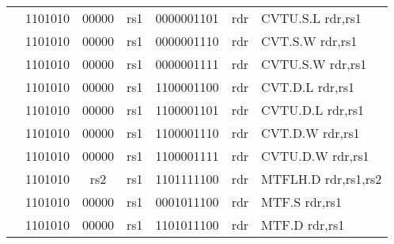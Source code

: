 \begin{table}[p]
\begin{small}
\begin{center}
\begin{tabular}{rcccccccccl}
&
\multicolumn{2}{|c|}{1101010} &
\multicolumn{1}{c|}{00000} &
\multicolumn{1}{c|}{rs1} &
\multicolumn{4}{c|}{0000001101} &
\multicolumn{1}{c|}{rdr} & CVTU.S.L rdr,rs1 \\
\cline{2-10}
  

&
\multicolumn{2}{|c|}{1101010} &
\multicolumn{1}{c|}{00000} &
\multicolumn{1}{c|}{rs1} &
\multicolumn{4}{c|}{0000001110} &
\multicolumn{1}{c|}{rdr} & CVT.S.W rdr,rs1 \\
\cline{2-10}
  

&
\multicolumn{2}{|c|}{1101010} &
\multicolumn{1}{c|}{00000} &
\multicolumn{1}{c|}{rs1} &
\multicolumn{4}{c|}{0000001111} &
\multicolumn{1}{c|}{rdr} & CVTU.S.W rdr,rs1 \\
\cline{2-10}
  

&
\multicolumn{2}{|c|}{1101010} &
\multicolumn{1}{c|}{00000} &
\multicolumn{1}{c|}{rs1} &
\multicolumn{4}{c|}{1100001100} &
\multicolumn{1}{c|}{rdr} & CVT.D.L rdr,rs1 \\
\cline{2-10}
  

&
\multicolumn{2}{|c|}{1101010} &
\multicolumn{1}{c|}{00000} &
\multicolumn{1}{c|}{rs1} &
\multicolumn{4}{c|}{1100001101} &
\multicolumn{1}{c|}{rdr} & CVTU.D.L rdr,rs1 \\
\cline{2-10}
  

&
\multicolumn{2}{|c|}{1101010} &
\multicolumn{1}{c|}{00000} &
\multicolumn{1}{c|}{rs1} &
\multicolumn{4}{c|}{1100001110} &
\multicolumn{1}{c|}{rdr} & CVT.D.W rdr,rs1 \\
\cline{2-10}
  

&
\multicolumn{2}{|c|}{1101010} &
\multicolumn{1}{c|}{00000} &
\multicolumn{1}{c|}{rs1} &
\multicolumn{4}{c|}{1100001111} &
\multicolumn{1}{c|}{rdr} & CVTU.D.W rdr,rs1 \\
\cline{2-10}
  

&
\multicolumn{2}{|c|}{1101010} &
\multicolumn{1}{c|}{rs2} &
\multicolumn{1}{c|}{rs1} &
\multicolumn{4}{c|}{1101111100} &
\multicolumn{1}{c|}{rdr} & MTFLH.D rdr,rs1,rs2 \\
\cline{2-10}
  

&
\multicolumn{2}{|c|}{1101010} &
\multicolumn{1}{c|}{00000} &
\multicolumn{1}{c|}{rs1} &
\multicolumn{4}{c|}{0001011100} &
\multicolumn{1}{c|}{rdr} & MTF.S rdr,rs1 \\
\cline{2-10}
  

&
\multicolumn{2}{|c|}{1101010} &
\multicolumn{1}{c|}{00000} &
\multicolumn{1}{c|}{rs1} &
\multicolumn{4}{c|}{1101011100} &
\multicolumn{1}{c|}{rdr} & MTF.D rdr,rs1 \\
\cline{2-10}
  


\end{tabular}
\end{center}
\end{small}
\end{table}

